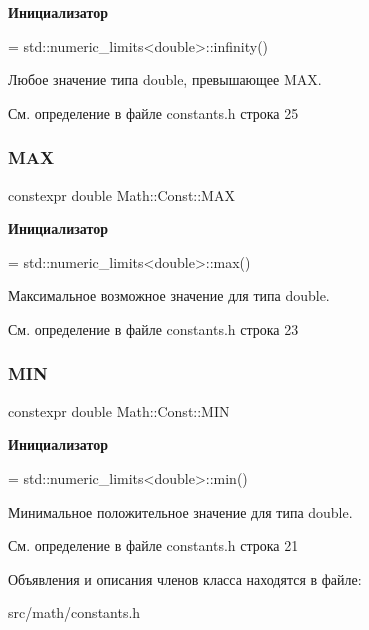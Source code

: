 {\bfseries Инициализатор}
\begin{DoxyCode}
=
        std::numeric\_limits<double>::infinity()
\end{DoxyCode}


Любое значение типа double, превышающее M\+AX. 



См. определение в файле constants.\+h строка 25

\hypertarget{class_math_1_1_const_aa6f0fbdf83bf388173d9712c2a9d2046}{}\label{class_math_1_1_const_aa6f0fbdf83bf388173d9712c2a9d2046} 
\subsubsection{\texorpdfstring{M\+AX}{MAX}}
{\footnotesize\ttfamily constexpr double Math\+::\+Const\+::\+M\+AX\hspace{0.3cm}{\ttfamily [static]}}

{\bfseries Инициализатор}
\begin{DoxyCode}
=
        std::numeric\_limits<double>::max()
\end{DoxyCode}


Максимальное возможное значение для типа double. 



См. определение в файле constants.\+h строка 23

\hypertarget{class_math_1_1_const_a787c7176528a33522741da6b45761378}{}\label{class_math_1_1_const_a787c7176528a33522741da6b45761378} 
\subsubsection{\texorpdfstring{M\+IN}{MIN}}
{\footnotesize\ttfamily constexpr double Math\+::\+Const\+::\+M\+IN\hspace{0.3cm}{\ttfamily [static]}}

{\bfseries Инициализатор}
\begin{DoxyCode}
=
        std::numeric\_limits<double>::min()
\end{DoxyCode}


Минимальное положительное значение для типа double. 



См. определение в файле constants.\+h строка 21



Объявления и описания членов класса находятся в файле\+:\begin{DoxyCompactItemize}
\item 
src/math/constants.\+h\end{DoxyCompactItemize}
